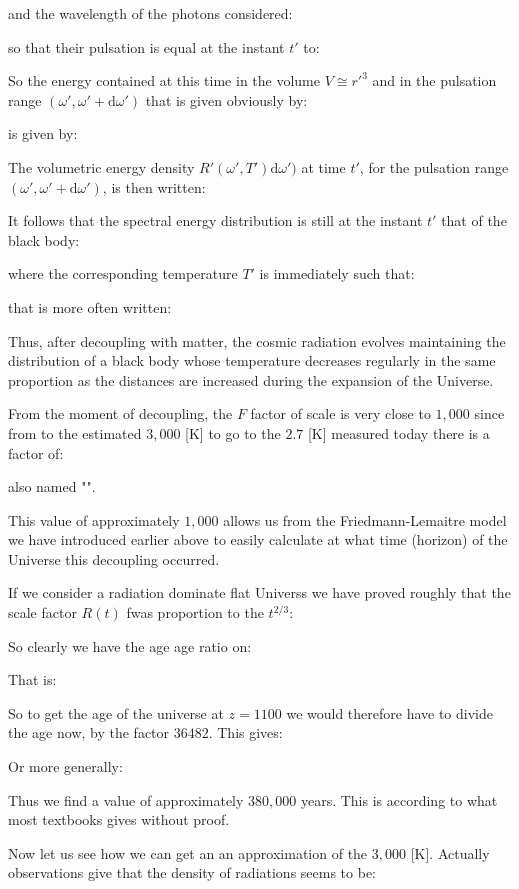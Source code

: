 	and the wavelength of the photons considered:
	
	so that their pulsation is equal at the instant $t'$ to:
	
	So the energy contained at this time in the volume $V\cong {r'}^3$ and in the pulsation range $(\omega',\omega'+\mathrm{d}\omega')$ that is given obviously by:
	
	is given by:
	
	The volumetric energy density $R'(\omega',T')\mathrm{d}\omega')$ at time $t'$, for the pulsation range $(\omega',\omega'+\mathrm{d}\omega')$, is then written:
	
	It follows that the spectral energy distribution is still at the instant $t'$ that of the black body:
	
	where the corresponding temperature $T'$ is immediately such that:
	
	that is more often written:
	
	Thus, after decoupling with matter, the cosmic radiation evolves maintaining the distribution of a black body whose temperature decreases regularly in the same proportion as the distances are increased during the expansion of the Universe.

	From the moment of decoupling, the $F$ factor of scale is very close to $1,000$ since from to the estimated $3,000$ [K] to go to the $2.7$ [K] measured today there is a factor of:
	
	also named "".
	
	 This value of approximately $1,000$ allows us from the Friedmann-Lemaitre model we have introduced earlier above to easily calculate at what time (horizon) of the Universe this decoupling occurred.
	 
	 If we consider a radiation dominate flat Universs we have proved roughly that the scale factor $R(t)$ fwas proportion to the $t^{2/3}$:
	
	So clearly we have the age age ratio on:
	
	That is:
	
	So to get the age of the universe at $z=1100$ we would therefore have to divide the age now, by the factor $36482$. This gives:
	
	Or more generally:
	
	 Thus we find a value of approximately $380,000$ years. This is according to what most textbooks gives without proof.
	 
	 Now let us see how we can get an an approximation of the $3,000$ [K]. Actually observations give that the density of radiations seems to be:
	
